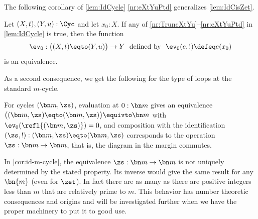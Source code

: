 The following corollary of \cref{lem:IdCycle} \ref{nr:eXtYuPtd}
generalizes \cref{lem:IdCisZet}.

\begin{corollary}\label{cor:ConnCycles}
  Let $(X,t),(Y,u):\Cyc$ and let $x_0:X$.
  If any of \ref{nr:TruncXtYu}--\ref{nr:eXtYuPtd} in \cref{lem:IdCycle} is
  true, then the function
  \[
    \ev_0:\bigl((X,t)\eqto(Y,u)\bigr)\to Y
    \text{~~defined by~~} \ev_0(e,!) \defeq e(x_0)
  \]
  is an equivalence.
\end{corollary}

As a second consequence,
we get the following for the type of loops at the standard $m$-cycle.
\begin{corollary}\label{cor:id-m-cycle}
  For cycles $(\bn m,\zs)$,
  evaluation at $0:\bn m$ gives an equivalence
  $\bigl((\bn m,\zs)\eqto(\bn m,\zs)\bigr) \equivto \bn m$
  with $\ev_0(\refl{(\bn m,\zs)}) = 0$, and
  composition with the identification
$(\zs,!): (\bn m,\zs)\eqto(\bn m,\zs)$
  corresponds to the operation $\zs:\bn m\to\bn m$,
  that is, the diagram in the margin commutes.
\end{corollary}

\begin{remark}\label{rem:thenonuniquenessofgeneratorsofmodulararithmetic1}
  In \cref{cor:id-m-cycle}, the equivalence $\zs:\bn m\to\bn m$ is not
  uniquely determined by the stated property. Its inverse would give the
  same result for any $\bn{m}$ (even for $\zet$). In fact there are
  as many as there are positive integers less than
  $m$ that are relatively prime to $m$.  This behavior has number theoretic
  consequences and origins and will be investigated further when we
  have the proper machinery to put it to good use.
\end{remark}

